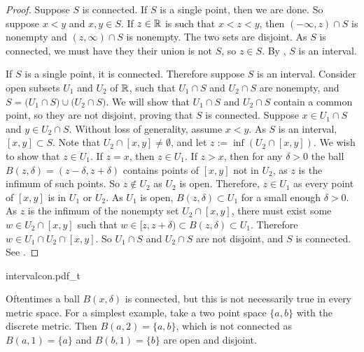 \begin{proof}
Suppose $S$ is connected.  If $S$ is a single point,
then we are done.  So suppose $x < y$ and $x,y \in S$.  If $z \in {\mathbb{R}}$ is such
that $x < z < y$, then $(-\infty,z) \cap S$ is nonempty and $(z,\infty) \cap
S$ is nonempty.  The two sets are disjoint.  As
$S$ is connected, we must have they their union is not $S$, so $z \in S$.
By , $S$ is an interval.

If $S$ is a single point, it is connected.
Therefore suppose $S$ is an interval.
Consider open subsets $U_1$ and $U_2$ of ${\mathbb{R}}$, such that
$U_1 \cap S$ and $U_2 \cap S$ are nonempty, and
$S = 
\bigl( U_1 \cap S \bigr)
\cup
\bigl( U_2 \cap S \bigr)$.  We will show that $U_1 \cap S$
and $U_2 \cap S$ contain a common point, so they are not disjoint,
proving that $S$ is connected.
Suppose $x \in U_1 \cap S$
and $y \in U_2 \cap S$.  Without loss of generality, assume $x < y$.
As $S$ is an interval, $[x,y] \subset S$.
Note that $U_2 \cap [x,y] \not= \emptyset$, and
let $z := \inf (U_2 \cap [x,y])$.
We wish to show that $z \in U_1$.
If $z = x$, then $z \in U_1$.
If $z > x$,
then for any $\delta > 0$ the ball $B(z,\delta) =
(z-\delta,z+\delta)$ contains points of $[x,y]$ not in $U_2$,
as $z$ is the infimum of such points.
So $z \notin U_2$ as $U_2$ is open.
Therefore, $z \in U_1$ as every point of $[x,y]$ is in
$U_1$ or $U_2$.
As $U_1$ is open,
$B(z,\delta) \subset U_1$ for a small enough $\delta > 0$.
As $z$ is the infimum of the nonempty set $U_2 \cap [x,y]$, 
there must exist some $w \in U_2 \cap [x,y]$
such that $w \in [z,z+\delta) \subset B(z,\delta) \subset U_1$.
Therefore $w \in U_1 \cap U_2 \cap [x,y]$.
So $U_1 \cap S$ and $U_2 \cap S$ are not disjoint, and
$S$ is connected.
See .
\end{proof}

\begin{myfigureht}
{intervalcon.pdf_t}
\caption{Proof that an interval is connected.\label{fig:intervalcon}}
\end{myfigureht}

\begin{example}
Oftentimes a ball $B(x,\delta)$ is connected, but this is not
necessarily true in every metric space.
For a simplest example, take a two point space $\{ a,
b\}$ with the discrete metric.  Then $B(a,2) = \{ a , b \}$, which is not
connected as $B(a,1) = \{ a \}$ and 
$B(b,1) = \{ b \}$ are open and disjoint.
\end{example}


